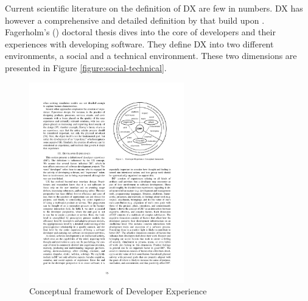 \documentclass[english, 12pt, a4paper, sci, utf8, a-1b, online]{aaltothesis}
\begin{document}
Current scientific literature on the definition of DX are few in numbers. DX has however a comprehensive and detailed definition by \textcite{fagerholm-doctoral-thesis} that build upon \textcite{fagerholm-dx-concept-and-definition}. Fagerholm's (\citeyear{fagerholm-doctoral-thesis}) doctoral thesis dives into the core of developers and their experiences with developing software. They define DX into two different environments, a social and a technical environment. These two dimensions are presented in Figure \ref{figure:social-technical}.

\begin{figure}
  \begin{center}
    \includegraphics[width=0.6\textwidth]{dx-conceptual.pdf}
  \end{center}
  \captionsetup{width=0.6\textwidth}
  \caption{Conceptual framework of Developer Experience \parencite{fagerholm-dx-concept-and-definition}}
  \label{figure:conceptual-framework}
\end{figure}
\end{document}
